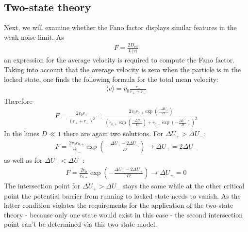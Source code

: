 \documentclass[12pt,a4paper]{article}
\begin{document}
\subsection{Two-state theory}
Next, we will examine whether the Fano factor displays similar features in the weak noise limit. As 
\begin{align*}
F=\frac{2D_{\text{eff}}}{L\langle v\rangle}
\end{align*}
an expression for the average velocity is required to compute the Fano factor. Taking into account that the average velocity is zero when the particle is in the locked state, one finds the following formula for the total mean velocity:
\begin{align*}
\langle v\rangle=v_0\frac{r_-}{r_++r_-}
\end{align*}
Therefore
\begin{align*}
F=\frac{2v_0r_+}{(r_++r_-)^2}=\frac{2v_0r_{0,+}\exp\left(\frac{-\Delta U_+}{D}\right)}{\left(r_{0,+}\exp\left(\frac{-\Delta U_+}{D}\right)+r_{0,-}\exp\left(-\frac{\Delta U_-}{D}\right)\right)^2}
\end{align*}
In the limes $D\ll1$ there are again two solutions. For $\Delta U_+ > \Delta U_-$:
\begin{align*}
F=\frac{2v_0r_{0,+}}{r_{0,-}^2}\exp\left(-\frac{\Delta U_+-2\Delta U_-}{D}\right) \rightarrow \Delta U_+=2\Delta U_-
\end{align*}
as well as for $\Delta U_+ < \Delta U_-$:
\begin{align*}
F=\frac{2v_0}{r_{0,+}}\exp\left(-\frac{\Delta U_+-2\Delta U_+}{D}\right) \rightarrow \Delta U_+=0
\end{align*}
The intersection point for $\Delta U_+ > \Delta U_-$ stays the same while at the other critical point the potential barrier from running to locked state needs to vanish. As the latter condition violates the requirements for the application of the two-state theory - because only one state would exist in this case - the second intersection point can't be determined via this two-state model.
\end{document}
